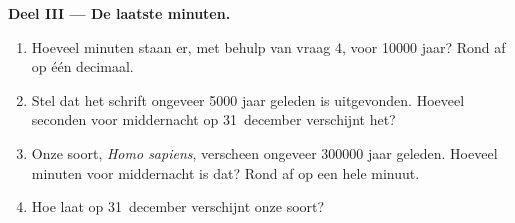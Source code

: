 \begin{problem}
\medskip
\noindent\textbf{Deel III --- De laatste minuten.}\par\nopagebreak
\begin{enumerate}[resume, beginpenalty=10000]
  \item Hoeveel minuten staan er, met behulp van vraag 4, voor
        \num{10000} jaar? Rond af op één decimaal.
  \item Stel dat het schrift ongeveer \num{5000} jaar geleden is
        uitgevonden. Hoeveel seconden voor middernacht op 31~december
        verschijnt het?
  \item Onze soort, \emph{Homo sapiens}, verscheen ongeveer \num{300000}
        jaar geleden. Hoeveel minuten voor middernacht is dat? Rond af op
        een hele minuut.
  \item Hoe laat op 31~december verschijnt onze soort?
\end{enumerate}
\end{problem}
